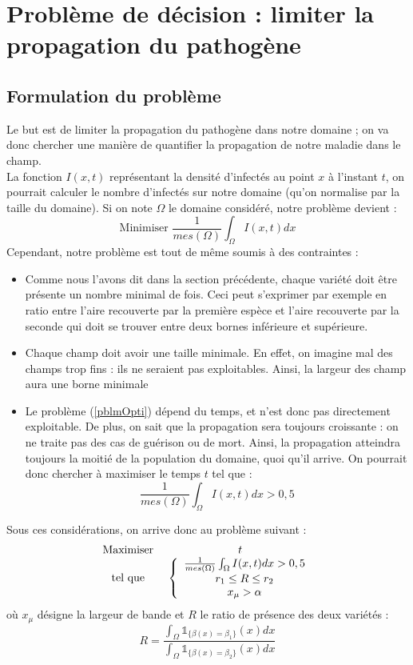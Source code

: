 \documentclass{article}
\begin{document}
\section{Problème de décision : limiter la propagation du pathogène}
\subsection{Formulation du problème}
Le but est de limiter la propagation du pathogène dans notre domaine ; on va donc chercher une manière de quantifier la propagation de notre maladie dans le champ.\\
La fonction $I(x,t)$ représentant la densité d'infectés au point $x$ à l'instant $t$, on pourrait calculer le nombre d'infectés sur notre domaine (qu'on normalise par la taille du domaine). Si on note $\Omega$ le domaine considéré, notre problème devient :
\begin{equation}\label{pblmOpti}
	\text{Minimiser } \frac{1}{mes(\Omega)}\int_\Omega I(x,t) dx
\end{equation}
Cependant, notre problème est tout de même soumis à des contraintes :
\begin{itemize}
	\item Comme nous l'avons dit dans la section précédente, chaque variété doit être présente un nombre minimal de fois. Ceci peut s'exprimer par exemple en ratio entre l'aire recouverte par la première espèce et l'aire recouverte par la seconde qui doit se trouver entre deux bornes inférieure et supérieure.
	\item Chaque champ doit avoir une taille minimale. En effet, on imagine mal des champs trop fins : ils ne seraient pas exploitables. Ainsi, la largeur des champ aura une borne minimale
	\item Le problème (\ref{pblmOpti}) dépend du temps, et n'est donc pas directement exploitable. De plus, on sait que la propagation sera toujours croissante : on ne traite pas des cas de guérison ou de mort. Ainsi, la propagation atteindra toujours la moitié de la population du domaine, quoi qu'il arrive. On pourrait donc chercher à maximiser le temps $t$ tel que :
	\[\frac{1}{mes(\Omega)}\int_\Omega I(x,t) dx > 0,5\]
\end{itemize}
Sous ces considérations, on arrive donc au problème suivant :
\begin{equation}\label{pblmOptiTot}
\begin{array}{c c}
	\text{Maximiser } &t\\
	\text{tel que } & \left\{\begin{array}{c}
			\frac{1}{mes(\Omega)}\int_\Omega I(x,t) dx > 0,5\\
			r_1\leq R\leq r_2\\
			x_{\mu}>\alpha
			\end{array}\right.
\end{array}
\end{equation}
où $x_{\mu}$ désigne la largeur de bande et $R$ le ratio de présence des deux variétés :
	\[R=\frac{\int_{\Omega} \mathds{1}_{\{\beta(x)=\beta_1\}}(x)dx}{\int_{\Omega} \mathds{1}_{\{\beta(x)=\beta_2\}}(x)dx}\]
\end{document}
